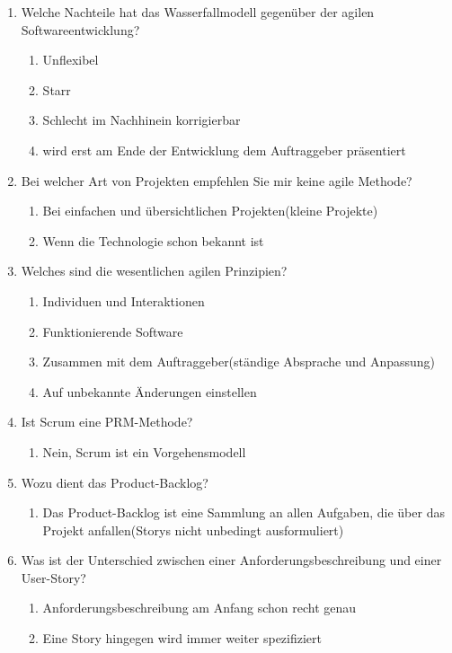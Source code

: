 \documentclass[12pt,a4paper]{article}
\begin{document}
\begin{enumerate}
\begin{enumerate}
	\end{enumerate}
	\item Welche Nachteile hat das Wasserfallmodell gegenüber der agilen Softwareentwicklung?
	\begin{enumerate}
		\item Unflexibel
		\item Starr 
		\item Schlecht im Nachhinein korrigierbar
		\item wird erst am Ende der Entwicklung dem Auftraggeber präsentiert
	\end{enumerate}
	\item Bei welcher Art von Projekten empfehlen Sie mir keine agile Methode?
	\begin{enumerate}
		\item Bei einfachen und übersichtlichen Projekten(kleine Projekte)
		\item Wenn die Technologie schon bekannt ist
	\end{enumerate}
	\item Welches sind die wesentlichen agilen Prinzipien?
	\begin{enumerate}
		\item Individuen und Interaktionen
		\item Funktionierende Software
		\item Zusammen mit dem Auftraggeber(ständige Absprache und Anpassung)
		\item Auf unbekannte Änderungen einstellen
	\end{enumerate}
	\item Ist Scrum eine PRM-Methode?
	\begin{enumerate}
		\item Nein, Scrum ist ein Vorgehensmodell
	\end{enumerate}
	\item Wozu dient das Product-Backlog?
	\begin{enumerate}
		\item Das Product-Backlog ist eine Sammlung an allen Aufgaben, die über das Projekt anfallen(Storys nicht unbedingt ausformuliert)
	\end{enumerate}
	\item Was ist der Unterschied zwischen einer Anforderungsbeschreibung und einer User-Story?
	\begin{enumerate}
		\item Anforderungsbeschreibung am Anfang schon recht genau
		\item Eine Story hingegen wird immer weiter spezifiziert

\end{enumerate}
\end{enumerate}
\end{document}
